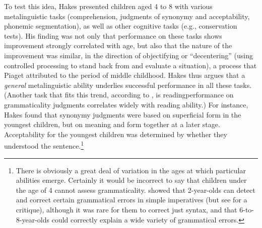 To test this idea, Hakes presented children aged 4 to 8 with various metalinguistic tasks (comprehension, judgments of synonymy and acceptability, phonemic segmentation), as well as other cognitive tasks (e.g., conservation tests). His finding was not only that performance on these tasks shows improvement strongly correlated with age, but also that the nature of the improvement was similar, in the direction of objectifying or ``decentering'' (using controlled processing to stand back from and evaluate a situation), a process that Piaget attributed to the period of middle childhood. Hakes thus argues that a \textit{general} metalinguistic ability underlies successful performance in all these tasks. (Another task that fits this trend, according to \citet{RyanEtAl1984}, is reading\schdash{}performance on grammaticality
judgments correlates widely with reading ability.) For instance, Hakes found that synonymy judgments were based on superficial form in the youngest children, but on meaning and form together at a later stage. Acceptability for the youngest children was determined by whether they understood the sentence.\footnote{There is obviously a great deal of variation in the ages at which particular abilities emerge. Certainly it would be incorrect to say that children under the age of 4 cannot assess grammaticality. \citet{GleitmanEtAl1972} showed that 2\textonehalf-year-olds can detect and correct certain grammatical errors in simple imperatives (but see \citet{Gombert1992} for a critique), although it was rare for them to correct just syntax, and that 6-to-8-year-olds could correctly explain a wide variety of grammatical errors.}


